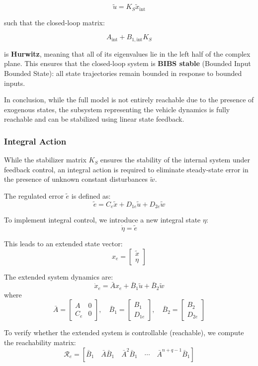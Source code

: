 \documentclass[]{report}
\begin{document}
\[
\tilde{u} = K_S \tilde{x}_{\text{int}}
\]

such that the closed-loop matrix:

\[
A_{\text{int}} + B_{1,\text{int}} K_S
\]

is \textbf{Hurwitz}, meaning that all of its eigenvalues lie in the left half of the complex plane. This ensures that the closed-loop system is \textbf{BIBS stable} (Bounded Input Bounded State): all state trajectories remain bounded in response to bounded inputs.

In conclusion, while the full model is not entirely reachable due to the presence of exogenous states, the subsystem representing the vehicle dynamics is fully reachable and can be stabilized using linear state feedback.


\subsubsection{Integral Action}

While the stabilizer matrix $K_S$ ensures the stability of the internal system under feedback control, an integral action is required to eliminate steady-state error in the presence of unknown constant disturbances $\tilde{w}$.

The regulated error $\tilde{e}$ is defined as:
\[
\tilde{e} = C_e \tilde{x} + D_{1e} \tilde{u} + D_{2e} \tilde{w}
\]

To implement integral control, we introduce a new integral state $\eta$:
\[
\dot{\eta} = \tilde{e}
\]

This leads to an extended state vector:
\[
x_e = \begin{bmatrix} \tilde{x} \\ \eta \end{bmatrix}
\]

The extended system dynamics are:
\[
\dot{x}_e = \bar{A} x_e + \bar{B}_1 \tilde{u} + \bar{B}_2 \tilde{w}
\]
where
\[
\bar{A} = \begin{bmatrix}
	A & 0 \\
	C_e & 0
\end{bmatrix},
\quad
\bar{B}_1 = \begin{bmatrix}
	B_1 \\
	D_{1e}
\end{bmatrix},
\quad
\bar{B}_2 = \begin{bmatrix}
	B_2 \\
	D_{2e}
\end{bmatrix}
\]

To verify whether the extended system is controllable (reachable), we compute the reachability matrix:
\[
\mathcal{R}_e = \left[\bar{B}_1 \quad \bar{A}\bar{B}_1 \quad \bar{A}^2\bar{B}_1 \quad \cdots \quad \bar{A}^{n+q-1} \bar{B}_1 \right]
\]
\end{document}
